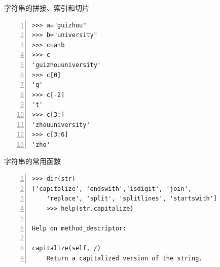 \documentclass{beamer}
\begin{document}
\begin{frame}[fragile]{字符串的拼接、索引和切片}
\begin{block}{}
\begin{Verbatim}[numbers=left,frame=single,rulecolor=\color{red}]
>>> a="guizhou"
>>> b="university"
>>> c=a+b
>>> c
'guizhouuniversity'
>>> c[0]
'g'
>>> c[-2]
't'
>>> c[3:]
'zhouuniversity'
>>> c[3:6]
'zho'
\end{Verbatim}
\end{block}
\end{frame}
\begin{frame}[fragile]{字符串的常用函数}
\begin{block}{}
\begin{Verbatim}[numbers=left,frame=single,rulecolor=\color{red}]
>>> dir(str)
['capitalize', 'endswith','isdigit', 'join',
    'replace', 'split', 'splitlines', 'startswith']
    >>> help(str.capitalize)

Help on method_descriptor:

capitalize(self, /)
    Return a capitalized version of the string.
\end{Verbatim}
\end{block}
\end{frame}
\end{document}
